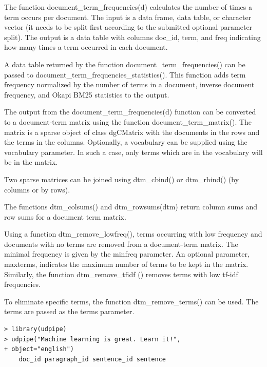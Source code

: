 \documentclass[11pt,openany,executivepaper]{book}
\begin{document}
The function document\_term\_frequencies(d) calculates the number of times a term occurs per document. The input is a data frame, data table, or character vector (it needs to be split first according to the submitted optional parameter split). The output is a data table with columns doc\_id, term, and freq indicating how many times a term occurred in each document.

A data table returned by the function document\_term\_frequencies() can be passed to document\_term\_frequencies\_statistics(). This function adds term frequency normalized by the number of terms in a document, inverse document frequency, and Okapi BM25 statistics to the output.
\begin{sloppypar}
  \raggedright
The output from the document\_term\_frequencies(d) function can be converted to a document-term matrix using the function document\_term\_matrix(). The matrix is a sparse object of class dgCMatrix with the documents in the rows and the terms in the columns. Optionally, a vocabulary can be supplied using the vocabulary parameter. In such a case, only terms which are in the vocabulary will be in the matrix.
  \end{sloppypar}

Two sparse matrices can be joined using dtm\_cbind() or dtm\_rbind() (by columns or by rows).

The functions dtm\_colsums() and dtm\_rowsums(dtm) return column sums and row sums for a document term matrix.

Using a function dtm\_remove\_lowfreq(), terms occurring with low frequency and documents with no terms are removed from a document-term matrix. The minimal frequency is given by the minfreq parameter. An optional parameter, maxterms, indicates the maximum number of terms to be kept in the matrix. Similarly, the function dtm\_remove\_tfidf () removes terms with low tf-idf frequencies.

To eliminate specific terms, the function dtm\_remove\_terms() can be used. The terms are passed as the terms parameter.

\begin{verbatim}
> library(udpipe)
> udpipe("Machine learning is great. Learn it!",
+ object="english")
    doc_id paragraph_id sentence_id sentence
\end{verbatim}
\end{document}
